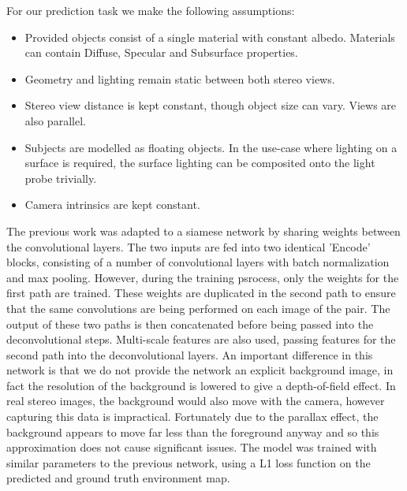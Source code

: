 \documentclass[ %
                    author={Gavin Parker},
                supervisor={Dr. Neill Campbell},
                    degree={MEng},
                     title={Deep Siamese Networks for Illumination Estimation from Stereo Images},
                  subtitle={},
                      type={research},
                      year={2018} ]{dissertation}
\begin{document}
\newline
For our prediction task we make the following assumptions:
\begin{itemize}
\item Provided objects consist of a single material with constant albedo. Materials can contain Diffuse, Specular and Subsurface properties.
\item Geometry and lighting remain static between both stereo views.
\item Stereo view distance is kept constant, though object size can vary. Views are also parallel.
\item Subjects are modelled as floating objects. In the use-case where lighting on a surface is required, the surface lighting can be composited onto the light probe trivially.
\item Camera intrinsics are kept constant.
\end{itemize}
The previous work was adapted to a siamese network by sharing weights between the convolutional layers. The two inputs are fed into two identical 'Encode' blocks, consisting of a number of convolutional layers with batch normalization and max pooling. However, during the training psrocess, only the weights for the first path are trained. These weights are duplicated in the second path to ensure that the same convolutions are being performed on each image of the pair. The output of these two paths is then concatenated before being passed into the deconvolutional steps. Multi-scale features are also used, passing features for the second path into the deconvolutional layers. An important difference in this network is that we do not provide the network an explicit background image, in fact the resolution of the background is lowered to give a depth-of-field effect. In real stereo images, the background would also move with the camera, however capturing this data is impractical. Fortunately due to the parallax effect, the background appears to move far less than the foreground anyway and so this approximation does not cause significant issues. The model was trained with similar parameters to the previous network, using a L1 loss function on the predicted and ground truth environment map.
\end{document}
